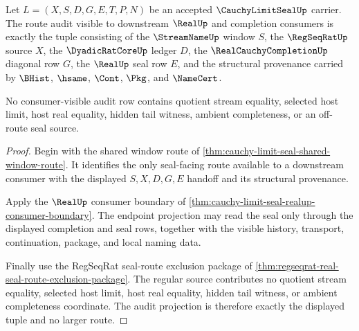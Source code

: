 \begin{theorem}
\label{thm:cauchy-limit-seal-route-audit-projection}
Let $L=(X,S,D,G,E,T,P,N)$ be an accepted $\CauchyLimitSealUp$ carrier. The route audit visible to downstream $\RealUp$ and completion consumers is exactly the tuple consisting of the $\StreamNameUp$ window $S$, the $\RegSeqRatUp$ source $X$, the $\DyadicRatCoreUp$ ledger $D$, the $\RealCauchyCompletionUp$ diagonal row $G$, the $\RealUp$ seal row $E$, and the structural provenance carried by $\BHist$, $\hsame$, $\Cont$, $\Pkg$, and $\NameCert$.

No consumer-visible audit row contains quotient stream equality, selected host limit, host real equality, hidden tail witness, ambient completeness, or an off-route seal source.
\end{theorem}
\begin{proof}
Begin with the shared window route of \autoref{thm:cauchy-limit-seal-shared-window-route}. It identifies the only seal-facing route available to a downstream consumer with the displayed $S,X,D,G,E$ handoff and its structural provenance.

Apply the $\RealUp$ consumer boundary of \autoref{thm:cauchy-limit-seal-realup-consumer-boundary}. The endpoint projection may read the seal only through the displayed completion and seal rows, together with the visible history, transport, continuation, package, and local naming data.

Finally use the RegSeqRat seal-route exclusion package of \autoref{thm:regseqrat-real-seal-route-exclusion-package}. The regular source contributes no quotient stream equality, selected host limit, host real equality, hidden tail witness, or ambient completeness coordinate. The audit projection is therefore exactly the displayed tuple and no larger route.
\end{proof}

